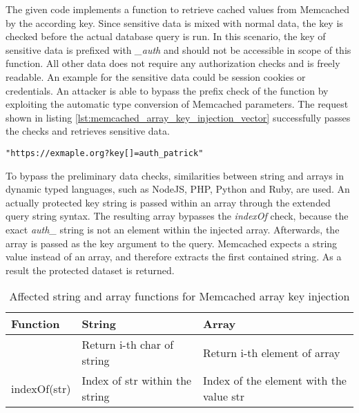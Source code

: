 The given code implements a function to retrieve cached values from Memcached by the according key. Since sensitive data is mixed with normal data, the key is checked before the actual database query is run. In this scenario, the key of sensitive data is prefixed with \emph{\_auth} and should not be accessible in scope of this function. All other data does not require any authorization checks and is freely readable. An example for the sensitive data could be session cookies or credentials. An attacker is able to bypass the prefix check of the function by exploiting the automatic type conversion of Memcached parameters. The request shown in listing \ref{lst:memcached_array_key_injection_vector} successfully passes the checks and retrieves sensitive data. \\

\begin{lstlisting}[caption={Attack vectors on Memcached for array key injection via HTTP GET}, label={lst:memcached_array_key_injection_vector}]
"https://exmaple.org?key[]=auth_patrick"
\end{lstlisting}

To bypass the preliminary data checks, similarities between string and arrays in dynamic typed languages, such as NodeJS, PHP, Python and Ruby, are used. An actually protected key string is passed within an array through the extended query string syntax. The resulting array bypasses the \emph{indexOf} check, because the exact \emph{auth\_} string is not an element within the injected array. Afterwards, the array is passed as the key argument to the query. Memcached expects a string value instead of an array, and therefore extracts the first contained string. As a result the protected dataset is returned.\\

\begin{table}[h]
 \sffamily
 \centering
 \begin{tabular}{lll}
  \textbf{Function} & \textbf{String} & \textbf{Array}\\ \hline
  [i]               & Return i-th char of string     & Return i-th element of array \\
  indexOf(str)   & Index of str within the string & Index of the element with the value str \\
 \end{tabular}
 \caption{Affected string and array functions for Memcached array key injection}
 \label{tab:mecached_affected_functions}
\end{table}


